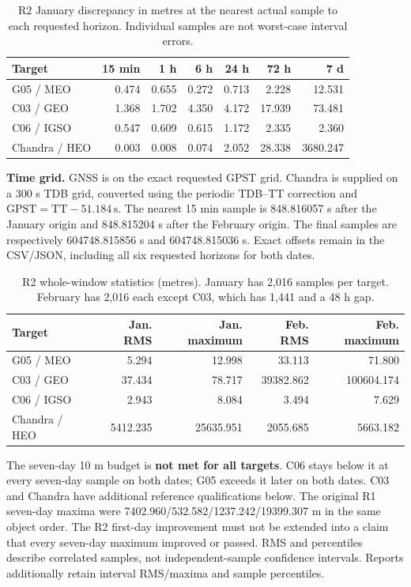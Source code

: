 \begin{table}[htbp]
\centering\small
\caption{R2 January discrepancy in metres at the nearest actual sample to each
requested horizon. Individual samples are not worst-case interval errors.}
\label{tab:orbit-horizon-samples}
\begin{tabular*}{\linewidth}{@{\extracolsep{\fill}}lrrrrrr@{}}
\toprule
Target & 15 min & 1 h & 6 h & 24 h & 72 h & 7 d\\
\midrule
G05 / MEO & 0.474 & 0.655 & 0.272 & 0.713 & 2.228 & 12.531\\
C03 / GEO & 1.368 & 1.702 & 4.350 & 4.172 & 17.939 & 73.481\\
C06 / IGSO & 0.547 & 0.609 & 0.615 & 1.172 & 2.335 & 2.360\\
Chandra / HEO & 0.003 & 0.008 & 0.074 & 2.052 & 28.338 & 3680.247\\
\bottomrule
\end{tabular*}
\end{table}

\textbf{Time grid.} GNSS is on the exact requested GPST grid. Chandra is supplied
on a 300 s TDB grid, converted using the periodic TDB--TT correction and
$\mathrm{GPST}=\mathrm{TT}-51.184\,\mathrm{s}$. The nearest 15 min sample is
848.816057 s after the January origin and 848.815204 s after the February
origin. The final samples are respectively 604748.815856 s and
604748.815036 s. Exact offsets remain in the CSV/JSON, including all six
requested horizons for both dates.

\begin{table}[htbp]
\centering\small
\caption{R2 whole-window statistics (metres). January has 2,016 samples per
target. February has 2,016 each except C03, which has 1,441 and a 48 h gap.}
\label{tab:orbit-period-errors}
\begin{tabular*}{\linewidth}{@{\extracolsep{\fill}}lrrrr@{}}
\toprule
Target & Jan. RMS & Jan. maximum & Feb. RMS & Feb. maximum\\
\midrule
G05 / MEO & 5.294 & 12.998 & 33.113 & 71.800\\
C03 / GEO & 37.434 & 78.717 & 39382.862 & 100604.174\\
C06 / IGSO & 2.943 & 8.084 & 3.494 & 7.629\\
Chandra / HEO & 5412.235 & 25635.951 & 2055.685 & 5663.182\\
\bottomrule
\end{tabular*}
\end{table}

The seven-day 10 m budget is \textbf{not met for all targets}. C06 stays
below it at every seven-day sample on both dates; G05 exceeds it later on both
dates. C03 and Chandra have additional reference qualifications below.
The original R1 seven-day maxima were 7402.960/532.582/1237.242/19399.307 m
in the same object order. The R2 first-day improvement must not be extended
into a claim that every seven-day maximum improved or passed.
RMS and percentiles describe correlated samples, not independent-sample
confidence intervals. Reports additionally retain interval RMS/maxima and
sample percentiles.


